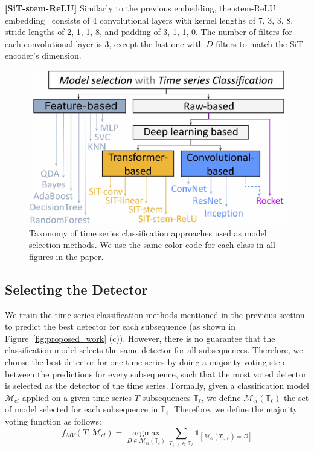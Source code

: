 \noindent\textbf{[SiT-stem-ReLU]}
Similarly to the previous embedding, the stem-ReLU embedding~\cite{wang2022scaled} consists of 4 convolutional layers with kernel lengths of 7, 3, 3, 8, stride lengths of 2, 1, 1, 8, and padding of 3, 1, 1, 0. The number of filters for each convolutional layer is 3, except the last one with $D$ filters to match the SiT encoder's dimension.

\begin{figure}
    \centering
    \includegraphics[width=0.76\linewidth]{figures/4_taxonomy_MS.jpg}
    \vspace{-0.3cm}
    \caption{Taxonomy of time series classification approaches used as model selection methods. We use the same color code for each class in all figures in the paper.}
    \label{fig:taxonomy}
    \vspace{-0.3cm}
\end{figure}


\subsection{Selecting the Detector}

We train the time series classification methods mentioned in the previous section to predict the best detector for each subsequence (as shown in Figure~\ref{fig:proposed_work} (c)). However, there is no guarantee that the classification model selects the same detector for all subsequences. Therefore, we choose the best detector for one time series by doing a majority voting step between the predictions for every subsequence, such that the most voted detector is selected as the detector of the time series. Formally, given a classification model $\mathcal{M}_{cl}$ applied on a given time series $T$ subsequences $\mathbb{T}_\ell$, we define $\mathcal{M}_{cl}(\mathbb{T}_\ell)$ the set of model selected for each subsequence in $\mathbb{T}_\ell$. Therefore, we define the majority voting function as follows:
\begin{equation*}
     f_{MV}(T,\mathcal{M}_{cl}) = \operatorname*{argmax}_{D \in \mathcal{M}_{cl}(\mathbb{T}_\ell)} \sum_{T_{i, \ell} \in \mathbb{T}_\ell} \mathds{1}_{[\mathcal{M}_{cl}(T_{i, \ell}) = D]}
\end{equation*}

